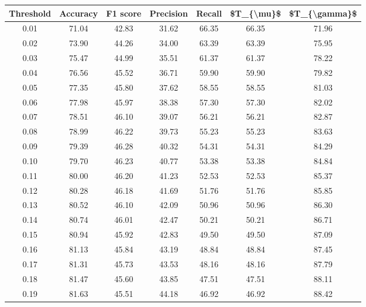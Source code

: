 \begin{tabular}{|c|c|c|c|c|c|c|}
\hline
 Threshold &  Accuracy &  F1 score &  Precision &  Recall &  \$T\_\{\textbackslash mu\}\$ &  \$T\_\{\textbackslash gamma\}\$ \\
\hline
      0.01 &     71.04 &     42.83 &      31.62 &   66.35 &      66.35 &         71.96 \\
      0.02 &     73.90 &     44.26 &      34.00 &   63.39 &      63.39 &         75.95 \\
      0.03 &     75.47 &     44.99 &      35.51 &   61.37 &      61.37 &         78.22 \\
      0.04 &     76.56 &     45.52 &      36.71 &   59.90 &      59.90 &         79.82 \\
      0.05 &     77.35 &     45.80 &      37.62 &   58.55 &      58.55 &         81.03 \\
      0.06 &     77.98 &     45.97 &      38.38 &   57.30 &      57.30 &         82.02 \\
      0.07 &     78.51 &     46.10 &      39.07 &   56.21 &      56.21 &         82.87 \\
      0.08 &     78.99 &     46.22 &      39.73 &   55.23 &      55.23 &         83.63 \\
      0.09 &     79.39 &     46.28 &      40.32 &   54.31 &      54.31 &         84.29 \\
      0.10 &     79.70 &     46.23 &      40.77 &   53.38 &      53.38 &         84.84 \\
      0.11 &     80.00 &     46.20 &      41.23 &   52.53 &      52.53 &         85.37 \\
      0.12 &     80.28 &     46.18 &      41.69 &   51.76 &      51.76 &         85.85 \\
      0.13 &     80.52 &     46.10 &      42.09 &   50.96 &      50.96 &         86.30 \\
      0.14 &     80.74 &     46.01 &      42.47 &   50.21 &      50.21 &         86.71 \\
      0.15 &     80.94 &     45.92 &      42.83 &   49.50 &      49.50 &         87.09 \\
      0.16 &     81.13 &     45.84 &      43.19 &   48.84 &      48.84 &         87.45 \\
      0.17 &     81.31 &     45.73 &      43.53 &   48.16 &      48.16 &         87.79 \\
      0.18 &     81.47 &     45.60 &      43.85 &   47.51 &      47.51 &         88.11 \\
      0.19 &     81.63 &     45.51 &      44.18 &   46.92 &      46.92 &         88.42 \\

\end{tabular}
